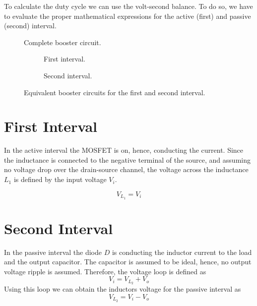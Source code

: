 To calculate the duty cycle we can use the volt-second balance.
To do so, we have to evaluate the proper mathematical expressions
for the active (first) and passive (second) interval.

\begin{figure}[h!]
	\centering
	\def\svgscale{\schematicscale}
	
	\caption{Complete booster circuit.}
\end{figure}

\begin{figure}[h!]
	\centering
	\begin{subfigure}[b]{0.48\textwidth}
		\centering
		\def\svgscale{\schematicscale}
		
		\caption{First interval.}
	\end{subfigure}
	\begin{subfigure}[b]{0.48\textwidth}
		\centering
		\def\svgscale{\schematicscale}
		
		\caption{Second interval.}
	\end{subfigure}
	\caption{Equivalent booster circuits for the first and second interval.}
\end{figure}


\section{First Interval}
In the active interval the MOSFET is on, hence, conducting the current.
Since the inductance is connected to the negative terminal of the source,
and assuming no voltage drop over the drain-source channel, the voltage
across the inductance $L_1$ is defined by the input voltage $V_i$. 

\[ V_{L_{1}} = V_i \]

%	

\section{Second Interval}
In the passive interval the diode $D$ is conducting the inductor
current to the load and the output capacitor. The capacitor is assumed
to be ideal, hence, no output voltage ripple is assumed. Therefore, the
voltage loop is defined as
\[ V_i = V_{L_{2}} + V_o \]
Using this loop we can obtain the inductors voltage for the passive
interval as
\[ V_{L_{2}} = V_i - V_o \]

